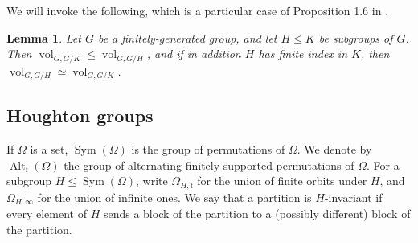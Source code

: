 \documentclass[11pt]{amsart}
\newcommand{\Sym}{\ensuremath{\operatorname{Sym}}}%
\newcommand{\Alt}{\ensuremath{\operatorname{Alt}}}%
\newcommand{\vol}{\ensuremath{\operatorname{vol}}}%
\theoremstyle{definition}
\theoremstyle{plain}
\newtheorem{lem}[defin]{Lemma}
\theoremstyle{remark}
\begin{document}

We will invoke the following, which is a particular case of Proposition 1.6 in \cite{LB-MB-solv}. 

\begin{lem}
	\label{lem:FiniteIndex}
	Let $G$ be a finitely-generated group, and let $H \leq K$ be subgroups of $G$. Then $\vol_{G, G/K} \le \vol_{G, G/H}$, and if in addition $H$ has finite index in $K$, then $\vol_{G, G/H} \simeq \vol_{G, G/K}$.
\end{lem}







\subsection{Houghton groups} \label{subsec-houghton}

If $\Omega$ is a set, $\Sym(\Omega)$ is the group of permutations of $\Omega$. We denote by $\Alt_{\mathrm{f}}(\Omega)$  the group of alternating finitely supported permutations of $\Omega$. For a subgroup $H \leq \Sym(\Omega)$, write $\Omega_{H,\mathrm{f}}$ for the union of finite orbits under $H$, and $\Omega_{H,\infty}$ for the union of infinite ones. We say that a partition is $H$-invariant if every element of $H$ sends a block of the partition to a (possibly different) block of the partition.
\end{document}
